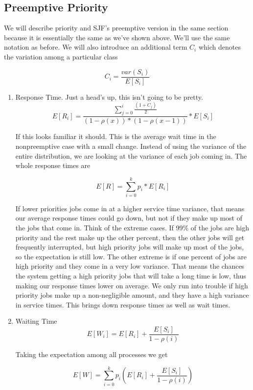 \subsection{Preemptive Priority}

We will describe priority and SJF's preemptive version in the same section because it is essentially the same as we've shown above.
We'll use the same notation as before.
We will also introduce an additional term $C_i$ which denotes the variation among a particular class

\[
    C_i = \frac{var(S_i)}{E[S_i]}
\]

\begin{enumerate}
\item Response Time. Just a head's up, this isn't going to be pretty.
  \[
  E[R_i] = \frac{\sum\limits_{j=0}^i\frac{(1 + C_j)}{2}}{(1 - \rho(x))*( 1 - \rho(x-1))} * E[S_i]
  \]

  If this looks familiar it should.
  This is the average wait time in the nonpreemptive case with a small change. Instead of using the variance of the entire distribution, we are looking at the variance of each job coming in.
  The whole response times are

  \[
     E[R] = \sum\limits_{i = 0}^k p_i * E[R_i]
  \]

  If lower priorities jobs come in at a higher service time variance, that means our average response times could go down, but not if they make up most of the jobs that come in.
  Think of the extreme cases.
  If 99\% of the jobs are high priority and the rest make up the other percent, then the other jobs will get frequently interrupted, but high priority jobs will make up most of the jobs, so the expectation is still low.
  The other extreme is if one percent of jobs are high priority and they come in a very low variance.
  That means the chances the system getting a high priority jobs that will take a long time is low, thus making our response times lower on average.
  We only run into trouble if high priority jobs make up a non-negligible amount, and they have a high variance in service times.
  This brings down response times as well as wait times.

\item Waiting Time
  \[
  E[W_i] = E[R_i] + \frac{E[S_i]}{1 - \rho(i)}
  \]

  Taking the expectation among all processes we get

  \[
  E[W] = \sum\limits_{i = 0}^k p_i (E[R_i] + \frac{E[S_i]}{1 - \rho(i)})
  \]


\end{enumerate}
